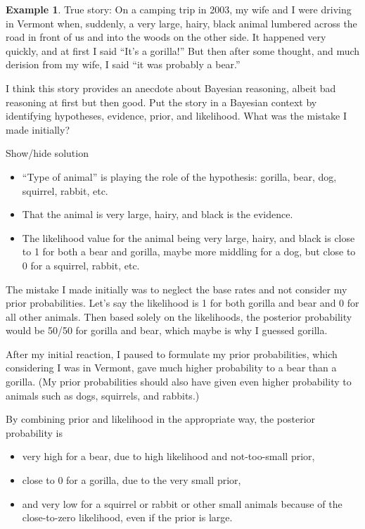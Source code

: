\documentclass[
]{book}
\providecommand{\tightlist}{%
  \setlength{\itemsep}{0pt}\setlength{\parskip}{0pt}}
\theoremstyle{definition}
\theoremstyle{definition}
\newtheorem{example}{Example}[chapter]
\theoremstyle{definition}
\theoremstyle{remark}
\begin{document}
\begin{example}
\protect\hypertarget{exm:unnamed-chunk-29}{}{\label{exm:unnamed-chunk-29} }
True story: On a camping trip in 2003, my wife and I were driving in Vermont when, suddenly, a very large, hairy, black animal lumbered across the road in front of us and into the woods on the other side. It happened very quickly, and at first I said ``It's a gorilla!'' But then after some thought, and much derision from my wife, I said ``it was probably a bear.''

I think this story provides an anecdote about Bayesian reasoning, albeit bad reasoning at first but then good. Put the story in a Bayesian context by identifying hypotheses, evidence, prior, and likelihood. What was the mistake I made initially?
\end{example}

Show/hide solution

\begin{itemize}
\tightlist
\item
  ``Type of animal'' is playing the role of the hypothesis: gorilla, bear, dog, squirrel, rabbit, etc.
\item
  That the animal is very large, hairy, and black is the evidence.
\item
  The likelihood value for the animal being very large, hairy, and black is close to 1 for both a bear and gorilla, maybe more middling for a dog, but close to 0 for a squirrel, rabbit, etc.
\end{itemize}

The mistake I made initially was to neglect the base rates and not consider my prior probabilities. Let's say the likelihood is 1 for both gorilla and bear and 0 for all other animals. Then based solely on the likelihoods, the posterior probability would be 50/50 for gorilla and bear, which maybe is why I guessed gorilla.

After my initial reaction, I paused to formulate my prior probabilities, which considering I was in Vermont, gave much higher probability to a bear than a gorilla. (My prior probabilities should also have given even higher probability to animals such as dogs, squirrels, and rabbits.)

By combining prior and likelihood in the appropriate way, the posterior probability is

\begin{itemize}
\tightlist
\item
  very high for a bear, due to high likelihood and not-too-small prior,
\item
  close to 0 for a gorilla, due to the very small prior,
\item
  and very low for a squirrel or rabbit or other small animals because of the close-to-zero likelihood, even if the prior is large.
\end{itemize}
\end{document}
